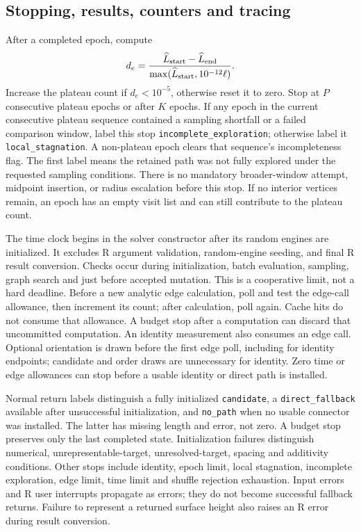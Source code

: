 \documentclass[11pt,letterpaper]{article}
\newcommand{\src}[1]{\nolinkurl{#1}}
\begin{document}
\subsection{Stopping, results, counters and tracing}
\label{sec:cpp-outcomes}

After a completed epoch, compute
\[
 d_e=\frac{\widehat L_{\rm start}-\widehat L_{\rm end}}
 {\max(\widehat L_{\rm start},10^{-12}\ell)}.
\]
Increase the plateau count if $d_e<10^{-5}$, otherwise reset it to zero.
Stop at $P$ consecutive plateau epochs or after $K$ epochs. If any epoch in
the current consecutive plateau sequence contained a sampling shortfall or
a failed comparison window, label this stop \src{incomplete_exploration};
otherwise label it \src{local_stagnation}. A non-plateau epoch clears that
sequence's incompleteness flag. The first label means the retained path was
not fully explored under the requested sampling conditions. There is no
mandatory broader-window attempt, midpoint insertion, or radius escalation
before this stop. If no interior vertices remain, an epoch has an empty
visit list and can still contribute to the plateau count.

The time clock begins in the solver constructor after its random engines
are initialized. It excludes R argument validation, random-engine seeding,
and final R result conversion. Checks occur during initialization, batch
evaluation, sampling, graph search and just before accepted mutation. This
is a cooperative limit, not a hard deadline. Before a new analytic edge
calculation, poll and test the edge-call allowance, then increment its count;
after calculation, poll again. Cache hits do not consume that allowance.
A budget stop after a computation can discard that uncommitted computation.
An identity measurement also consumes an edge call. Optional orientation is
drawn before the first edge poll, including for identity endpoints; candidate
and order draws are unnecessary for identity. Zero time or edge allowances
can stop before a usable identity or direct path is installed.

Normal return labels distinguish a fully initialized \src{candidate}, a
\src{direct_fallback} available after unsuccessful initialization, and
\src{no_path} when no usable connector was installed. The latter has missing
length and error, not zero. A budget stop preserves only the last completed
state. Initialization failures distinguish numerical, unrepresentable-target,
unresolved-target, spacing and additivity conditions. Other stops include
identity, epoch limit, local stagnation, incomplete exploration, edge limit,
time limit and shuffle
rejection exhaustion. Input errors and R user interrupts propagate as errors;
they do not become successful fallback returns. Failure to represent a
returned surface height also raises an R error during result conversion.
\end{document}
